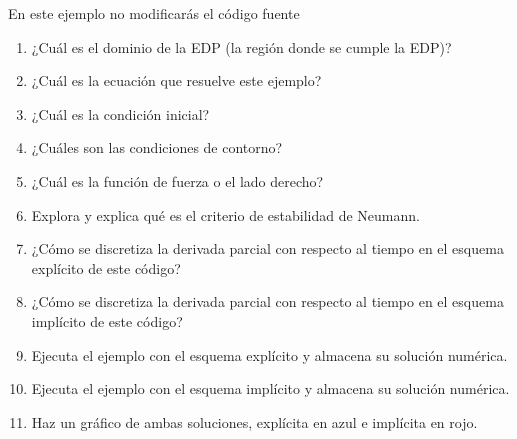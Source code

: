 \begin{problem}
En este ejemplo no modificarás el código fuente

\begin{enumerate}
    \item

          ¿Cuál es el dominio de la EDP (la región donde se cumple la EDP)?

    \item

          ¿Cuál es la ecuación que resuelve este ejemplo?

    \item

          ¿Cuál es la condición inicial?

    \item

          ¿Cuáles son las condiciones de contorno?

    \item

          ¿Cuál es la función de fuerza o el lado derecho?

    \item

          Explora y explica qué es el criterio de estabilidad de Neumann.

    \item

          ¿Cómo se discretiza la derivada parcial con respecto al tiempo en el esquema explícito de este código?

    \item

          ¿Cómo se discretiza la derivada parcial con respecto al tiempo en el esquema implícito de este código?

    \item

          Ejecuta el ejemplo con el esquema explícito y almacena su solución numérica.

    \item

          Ejecuta el ejemplo con el esquema implícito y almacena su solución numérica.

    \item

          Haz un gráfico de ambas soluciones, explícita en azul e
          implícita en rojo.
\end{enumerate}
\end{problem}
